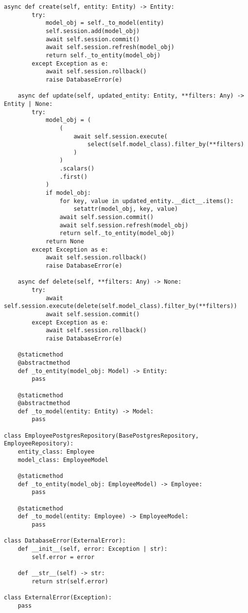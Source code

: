 \begin{lstlisting}[style=pythonstyle]
    async def create(self, entity: Entity) -> Entity:
        try:
            model_obj = self._to_model(entity)
            self.session.add(model_obj)
            await self.session.commit()
            await self.session.refresh(model_obj)
            return self._to_entity(model_obj)
        except Exception as e:
            await self.session.rollback()
            raise DatabaseError(e)

    async def update(self, updated_entity: Entity, **filters: Any) -> Entity | None:
        try:
            model_obj = (
                (
                    await self.session.execute(
                        select(self.model_class).filter_by(**filters)
                    )
                )
                .scalars()
                .first()
            )
            if model_obj:
                for key, value in updated_entity.__dict__.items():
                    setattr(model_obj, key, value)
                await self.session.commit()
                await self.session.refresh(model_obj)
                return self._to_entity(model_obj)
            return None
        except Exception as e:
            await self.session.rollback()
            raise DatabaseError(e)

    async def delete(self, **filters: Any) -> None:
        try:
            await self.session.execute(delete(self.model_class).filter_by(**filters))
            await self.session.commit()
        except Exception as e:
            await self.session.rollback()
            raise DatabaseError(e)

    @staticmethod
    @abstractmethod
    def _to_entity(model_obj: Model) -> Entity:
        pass

    @staticmethod
    @abstractmethod
    def _to_model(entity: Entity) -> Model:
        pass

class EmployeePostgresRepository(BasePostgresRepository, EmployeeRepository):
    entity_class: Employee
    model_class: EmployeeModel

    @staticmethod
    def _to_entity(model_obj: EmployeeModel) -> Employee:
        pass

    @staticmethod
    def _to_model(entity: Employee) -> EmployeeModel:
        pass

class DatabaseError(ExternalError):
    def __init__(self, error: Exception | str):
        self.error = error

    def __str__(self) -> str:
        return str(self.error)

class ExternalError(Exception):
    pass
\end{lstlisting}
